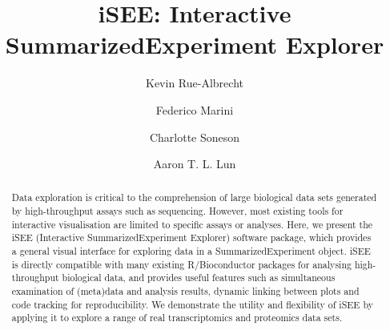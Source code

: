 \documentclass[10pt,a4paper,twocolumn]{article}
\begin{document}
\title{iSEE: Interactive SummarizedExperiment Explorer}
\author[1,$\dagger$]{Kevin Rue-Albrecht}
\author[2,3,$\dagger$]{Federico Marini}
\author[4,5,$\dagger$]{Charlotte Soneson}
\author[6,$\dagger$,$\ast$]{Aaron T. L. Lun}



\maketitle
\thispagestyle{fancy}


\begin{abstract}
Data exploration is critical to the comprehension of large biological data sets generated by high-throughput assays such as sequencing.
However, most existing tools for interactive visualisation are limited to specific assays or analyses.
Here, we present the iSEE (Interactive SummarizedExperiment Explorer) software package, which provides a general visual interface for exploring data in a SummarizedExperiment object.
iSEE is directly compatible with many existing R/Bioconductor packages for analysing high-throughput biological data,
and provides useful features such as simultaneous examination of (meta)data and analysis results, dynamic linking between plots and code tracking for reproducibility.
We demonstrate the utility and flexibility of iSEE by applying it to explore a range of real transcriptomics and proteomics data sets.


\end{abstract}
\end{document}
